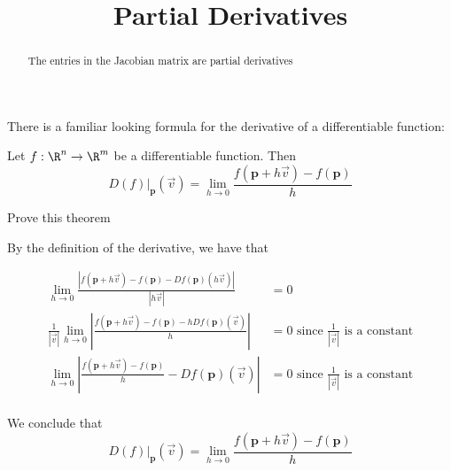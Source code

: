 \documentclass{ximera}
\title{Partial Derivatives}
\begin{document}
	\begin{abstract}
		The entries in the Jacobian matrix are partial derivatives
	\end{abstract}


	There is a familiar looking formula for the derivative of a differentiable function:
	
	\begin{theorem}
		Let $f:\R^n \to \R^m$ be a differentiable function.  Then
		\[
			D(f)\big|_{\mathbf{p}}(\vec{v}) = \displaystyle\lim_{h \to 0} \frac{f(\mathbf{p}+h\vec{v}) -f(\mathbf{p})}{h}
		\]
	\end{theorem}
	
	Prove this theorem
	
	\begin{free-response}
		By the definition of the derivative, we have that
		
		\begin{align*}
			\lim_{h \to 0} \frac{\left|f(\mathbf{p}+h\vec{v}) - f(\mathbf{p}) - Df(\mathbf{p})(h\vec{v})\right|}{|h\vec{v}|} &= 0\\
			\frac{1}{|\vec{v}|}\lim_{h \to 0} \left| \frac{f(\mathbf{p}+h\vec{v}) - f(\mathbf{p}) - hDf(\mathbf{p})(\vec{v})}{h} \right| &=0 \text{ since $\frac{1}{|\vec{v}|}$ is a constant}\\
			\lim_{h \to 0} \left| \frac{f(\mathbf{p}+h\vec{v}) - f(\mathbf{p})}{h} - Df(\mathbf{p})(\vec{v})\right| &=0 \text{ since $\frac{1}{|\vec{v}|}$ is a constant}\\
		\end{align*}
		
		We conclude that
		\[
			D(f)\big|_{\mathbf{p}}(\vec{v}) = \displaystyle\lim_{h \to 0} \frac{f(\mathbf{p}+h\vec{v}) -f(\mathbf{p})}{h}
		\]
	\end{free-response}
	
\end{document}
